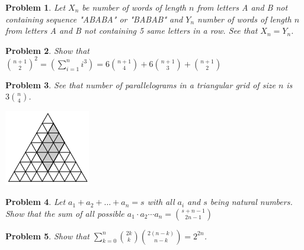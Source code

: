 \documentclass[11pt,a5paper]{article}
\newtheorem{problem}{Problem}
\begin{document}
\begin{problem}
Let $X_n$ be number of words of length $n$ from letters A and B not containing sequence "ABABA" or "BABAB" and $Y_n$ number of words of length $n$ from letters A and B not containing 5 same letters in a row. See that $X_n = Y_n$.
\end{problem}

\begin{problem}
Show that ${n+1 \choose 2}^2 = (\sum_{i=1}^n i^3) = 6{n+1 \choose 4} + 6{n+1 \choose 3} + {n+1 \choose 2}$
\end{problem}

\begin{problem}
See that number of parallelograms in a triangular grid of size $n$ is $3{n \choose 4}$.
\end{problem}
\includegraphics[scale=0.8]{triangle}

\begin{problem}
Let $a_1 + a_2 + \dots + a_n = s$ with all $a_i$ and $s$ being natural numbers. Show that the sum of all possible $a_1 \cdot a_2 \cdots a_n = {s + n - 1 \choose 2n - 1}$
\end{problem}

\begin{problem}
Show that $\sum_{k=0}^n {2k \choose k}{2(n-k)\choose n-k} = 2^{2n}$.
\end{problem}
\end{document}
